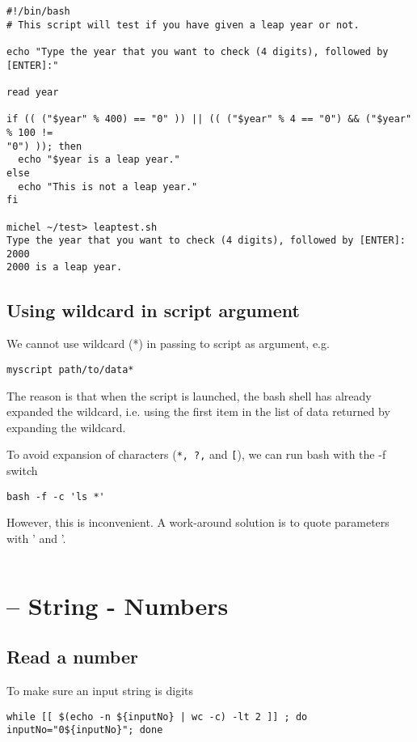 \begin{verbatim}
#!/bin/bash
# This script will test if you have given a leap year or not.

echo "Type the year that you want to check (4 digits), followed by [ENTER]:"

read year

if (( ("$year" % 400) == "0" )) || (( ("$year" % 4 == "0") && ("$year" % 100 !=
"0") )); then
  echo "$year is a leap year."
else
  echo "This is not a leap year."
fi

michel ~/test> leaptest.sh
Type the year that you want to check (4 digits), followed by [ENTER]:
2000
2000 is a leap year.
\end{verbatim}




\subsection{Using wildcard in script argument}

We cannot use wildcard (*) in passing to script as argument, e.g.
\begin{verbatim}
myscript path/to/data*
\end{verbatim}
The reason is that when the script is launched, the bash shell has already
expanded the wildcard, i.e. using the first item in the list of data returned by
expanding the wildcard.

To avoid expansion of characters (\verb.*, ?,. and \verb.[.), we can run bash
with the -f switch
\begin{verbatim}
bash -f -c 'ls *'
\end{verbatim}
However, this is inconvenient. A work-around solution is to quote parameters
with ' and '. 
\begin{verbatim}

\end{verbatim}



\section{-- String - Numbers}

\subsection{Read a number}

To make sure an input string is digits
\begin{verbatim}
while [[ $(echo -n ${inputNo} | wc -c) -lt 2 ]] ; do inputNo="0${inputNo}"; done
\end{verbatim}

